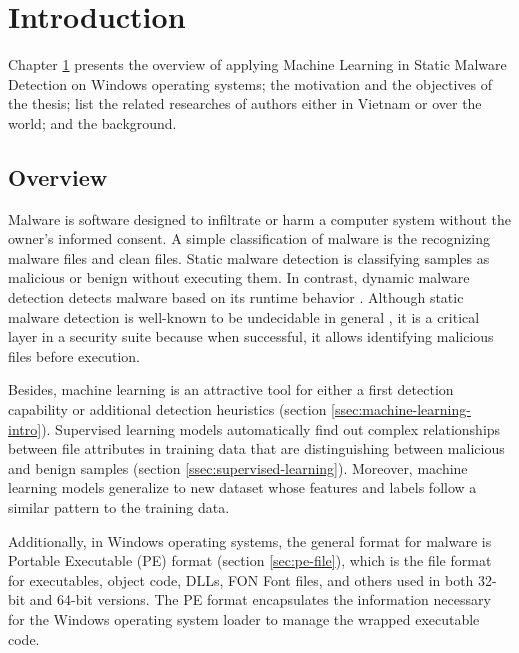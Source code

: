 
\chapter{Introduction}
\label{chap:introduction}
\graphicspath{{Chapter2/Figs/}}

\begin{chapabstract}
Chapter \ref{chap:introduction} presents the overview of applying Machine Learning in Static Malware Detection on Windows operating systems; the motivation and the objectives of the thesis; list the related researches of authors either in Vietnam or over the world; and the background.
\end{chapabstract}

\section{Overview}
\label{sec:overview}

Malware is software designed to infiltrate or harm a computer system without the owner's informed consent. 
A simple classification of malware is the recognizing malware files and clean files. 
Static malware detection is classifying samples as malicious or benign without executing them. 
In contrast, dynamic malware detection detects malware based on its runtime behavior \cite{athiwaratkun2017malware, dahl2013large}. 
Although static malware detection is well-known to be undecidable in general \cite{cohen1987computer}, it is a critical layer in a security suite because when successful, it allows identifying malicious files before execution.

Besides, machine learning is an attractive tool for either a first detection capability or additional detection heuristics (section \ref{ssec:machine-learning-intro}).
Supervised learning models automatically find out complex relationships between file attributes in training data that are distinguishing between malicious and benign samples (section \ref{ssec:supervised-learning}).
Moreover, machine learning models generalize to new dataset whose features and labels follow a similar pattern to the training data. 

Additionally, in Windows operating systems, the general format for malware is Portable Executable (PE) format (section \ref{sec:pe-file}), which is the file format for executables, object code, DLLs, FON Font files, and others used in both 32-bit and 64-bit versions. The PE format encapsulates the information necessary for the Windows operating system loader to manage the wrapped executable code.

